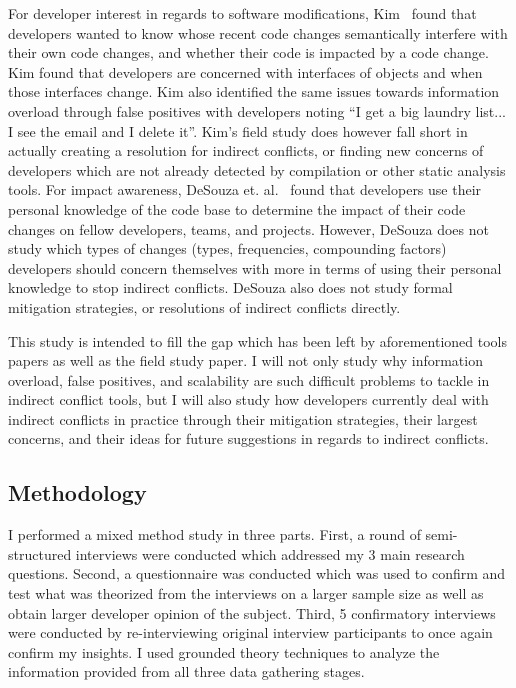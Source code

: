 For developer interest in regards to software modifications, Kim~\cite{Kim:2011:ESA} found that developers wanted to know whose
recent code changes semantically interfere with their own code changes, and whether their code is impacted by a code change.
Kim found that developers are concerned with interfaces of objects and when those interfaces change. Kim also identified the same 
issues towards information overload through false positives with developers noting ``I get a big laundry list... I see the email and I delete it''.
Kim's field study does however fall short in actually creating a resolution for indirect conflicts, or finding new concerns of
developers which are not already detected by compilation or other static analysis tools. 
For impact awareness, DeSouza et. al.~\cite{deSouza:2008:ESS} found that developers use their personal knowledge of the
code base to determine the impact of their code changes on fellow developers, teams, and projects. However, DeSouza does not
study which types of changes (types, frequencies, compounding factors) developers should concern themselves with more in terms of using their personal knowledge
to stop indirect conflicts. DeSouza also does not study formal mitigation strategies, or resolutions of indirect conflicts directly.

This study is intended to fill the gap which has been left by aforementioned tools papers as well as the field study paper.
I will not only study why information overload, false positives, and scalability are such difficult problems to tackle
in indirect conflict tools, but I will also study how developers currently deal with indirect conflicts in practice through
their mitigation strategies, their largest concerns, and their ideas for future suggestions in regards to indirect conflicts.

\subsection{Methodology}
\label{sec:exp-meth}

I performed a mixed method study in three parts. First, a round of semi-structured interviews were conducted which 
addressed my 3 main research questions. Second, a questionnaire was conducted
which was used to confirm and test what was theorized from the interviews on a larger sample size as well as obtain
larger developer opinion of the subject. Third, 5 confirmatory interviews were conducted by re-interviewing original
interview participants to once again confirm my insights.
I used grounded theory techniques to analyze the information provided from all three data gathering stages.

